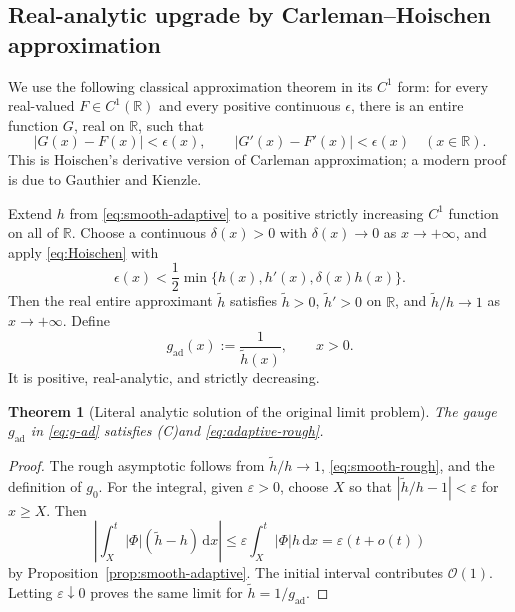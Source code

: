 \documentclass[11pt]{article}
\newtheorem{theorem}{Theorem}[section]
\theoremstyle{definition}
\theoremstyle{remark}
\newcommand{\R}{\mathbb R}
\newcommand{\dd}{\,\mathrm d}
\newcommand{\bigO}{\mathcal O}
\newcommand{\Ceq}{\textup{(C)}}
\begin{document}
\subsection{Real-analytic upgrade by Carleman--Hoischen approximation}

We use the following classical approximation theorem in its \(C^1\) form:
for every real-valued \(F\in C^1(\R)\) and every positive continuous
\(\epsilon\), there is an entire function \(G\), real on \(\R\), such that
\begin{equation}
 |G(x)-F(x)|<\epsilon(x),
 \qquad
 |G'(x)-F'(x)|<\epsilon(x)
 \quad(x\in\R).
 \label{eq:Hoischen}
\end{equation}
This is Hoischen's derivative version of Carleman approximation; a modern
proof is due to Gauthier and Kienzle\cite{gauthier-kienzle}.

Extend \(h\) from \eqref{eq:smooth-adaptive} to a positive strictly increasing
\(C^1\) function on all of \(\R\).  Choose a continuous
\(\delta(x)>0\) with \(\delta(x)\to0\) as \(x\to+\infty\), and apply
\eqref{eq:Hoischen} with
\begin{equation}
 \epsilon(x)<\frac12\min\{h(x),h'(x),\delta(x)h(x)\}.
 \label{eq:Hoischen-error}
\end{equation}
Then the real entire approximant \(\widetilde h\) satisfies
\(\widetilde h>0\), \(\widetilde h'>0\) on \(\R\), and
\(\widetilde h/h\to1\) as \(x\to+\infty\).  Define
\begin{equation}
 g_{\mathrm{ad}}(x):=\frac1{\widetilde h(x)},
 \qquad x>0.
 \label{eq:g-ad}
\end{equation}
It is positive, real-analytic, and strictly decreasing.

\begin{theorem}[Literal analytic solution of the original limit problem]
\label{thm:analytic-adaptive}
The gauge \(g_{\mathrm{ad}}\) in \eqref{eq:g-ad} satisfies \Ceq and
\eqref{eq:adaptive-rough}.
\end{theorem}

\begin{proof}
The rough asymptotic follows from
\(\widetilde h/h\to1\), \eqref{eq:smooth-rough}, and the definition of
\(g_0\).  For the integral, given \(\varepsilon>0\), choose \(X\) so that
\(|\widetilde h/h-1|<\varepsilon\) for \(x\ge X\).  Then
\[
 \left|\int_X^t|\Phi|(\widetilde h-h)\dd x\right|
 \le\varepsilon\int_X^t|\Phi|h\dd x
 =\varepsilon(t+o(t))
\]
by Proposition~\ref{prop:smooth-adaptive}.  The initial interval contributes
\(\bigO(1)\).  Letting \(\varepsilon\downarrow0\) proves the same limit for
\(\widetilde h=1/g_{\mathrm{ad}}\).
\end{proof}
\end{document}
